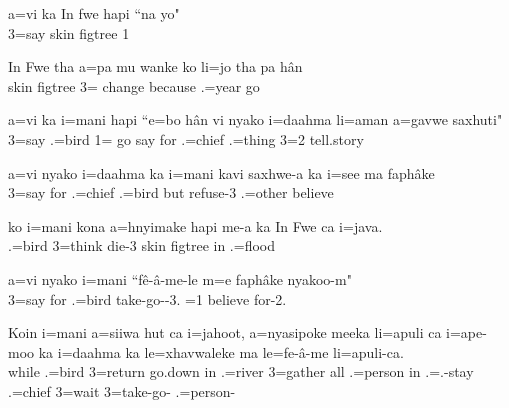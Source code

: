 \ea
\gll a=vi ka In fwe hapi ``na yo"\\ 3=say  skin figtree   1\\ \glt {}
\z

\ea
\gll In Fwe tha a=pa mu wanke ko li=jo tha pa hân\\ skin figtree  3=  change because .=year   go\\ \glt {}
\z

\ea
\gll a=vi ka i=mani hapi ``e=bo hân vi nyako i=daahma li=aman a=gavwe saxhuti"\\ 3=say  .=bird  1= go say for .=chief .=thing 3=2 tell.story\\ \glt {}
\z

\ea
\gll a=vi nyako i=daahma ka i=mani kavi saxhwe-a ka i=see ma faphâke\\ 
    3=say for .=chief  .=bird but refuse-3  .=other  believe\\ 
    \glt {}
\z

\ea
\gll ko i=mani kona a=hnyimake hapi me-a ka In Fwe ca i=java.\\  .=bird  3=think  die-3  skin figtree in .=flood\\ \glt {}
\z

\ea
\gll a=vi nyako i=mani ``fê-â-me-le m=e faphâke nyakoo-m"\\ 3=say for .=bird take-go--3. =1 believe for-2.\\ \glt {}
\z

\ea
\gll Koin i=mani a=siiwa hut ca i=jahoot, a=nyasipoke meeka li=apuli ca i=ape-moo ka i=daahma ka le=xhavwaleke ma le=fe-â-me li=apuli-ca.\\ while .=bird 3=return go.down in .=river 3=gather all .=person in .=.-stay  .=chief  3=wait  3=take-go- .=person-\\ \glt {}
\z

